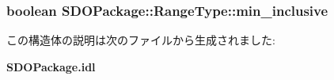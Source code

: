 \subsubsection[{min\_\-inclusive}]{\setlength{\rightskip}{0pt plus 5cm}boolean {\bf SDOPackage::RangeType::min\_\-inclusive}}\label{structSDOPackage_1_1RangeType_a59bf920ae92bdce181dfa296a03a72c7}


この構造体の説明は次のファイルから生成されました:\begin{DoxyCompactItemize}
\item 
{\bf SDOPackage.idl}\end{DoxyCompactItemize}
